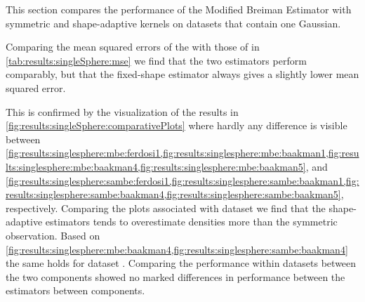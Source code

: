 
This section compares the performance of the Modified Breiman Estimator with symmetric and shape-adaptive kernels on datasets that contain one Gaussian. 
	\begin{table}
		\centering
		
		\caption{Performance of the Modified Breiman Estimator with fixed-shaped and shape-adaptive kernels on the datasets with a single Gaussian.} 	
		\label{tab:results:singleSphere:mse}
	\end{table}
	Comparing the mean squared errors of the \mbe with those of \sambe in \cref{tab:results:singleSphere:mse} we find that the two estimators perform comparably, but that the fixed-shape estimator always gives a slightly lower mean squared error. 

	\begin{figure*}
		\centering
		
		\caption{Plot of the density as estimated by - \mbe and - \sambe as a function of the known density of the datasets with a single Gaussian.}
		\label{fig:results:singleSphere:comparativePlots}
	\end{figure*}
	This is confirmed by the visualization of the results in \cref{fig:results:singleSphere:comparativePlots} where hardly any difference is visible between \cref{fig:results:singlesphere:mbe:ferdosi1,fig:results:singlesphere:mbe:baakman1,fig:results:singlesphere:mbe:baakman4,fig:results:singlesphere:mbe:baakman5}, and \cref{fig:results:singlesphere:sambe:ferdosi1,fig:results:singlesphere:sambe:baakman1,fig:results:singlesphere:sambe:baakman4,fig:results:singlesphere:sambe:baakman5}, respectively. 
		Comparing the plots associated with dataset \ferdosiOne we find that the shape-adaptive estimators tends to overestimate densities more than the symmetric observation. 
		Based on \cref{fig:results:singlesphere:mbe:baakman4,fig:results:singlesphere:sambe:baakman4} the same holds for dataset \baakmanFour. 
	Comparing the performance within datasets between the two components showed no marked differences in performance between the estimators between components.

